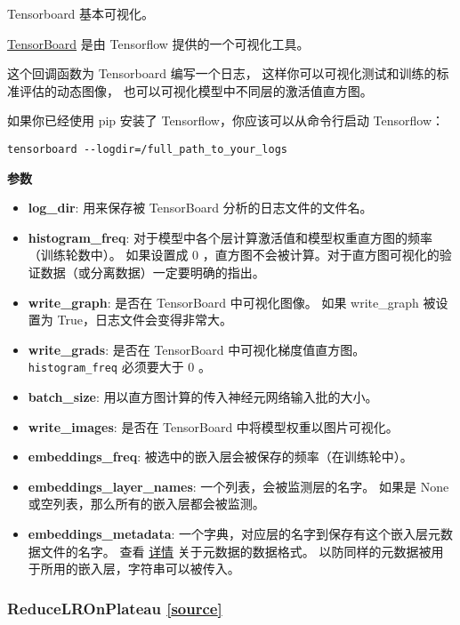 Tensorboard 基本可视化。

\href{https://www.tensorflow.org/get_started/summaries_and_tensorboard}{TensorBoard}
是由 Tensorflow 提供的一个可视化工具。

这个回调函数为 Tensorboard 编写一个日志，
这样你可以可视化测试和训练的标准评估的动态图像，
也可以可视化模型中不同层的激活值直方图。

如果你已经使用 pip 安装了 Tensorflow，你应该可以从命令行启动
Tensorflow：

\begin{verbatim}
tensorboard --logdir=/full_path_to_your_logs
\end{verbatim}

\textbf{参数}

\begin{itemize}
\tightlist
\item
  \textbf{log\_dir}: 用来保存被 TensorBoard 分析的日志文件的文件名。
\item
  \textbf{histogram\_freq}:
  对于模型中各个层计算激活值和模型权重直方图的频率（训练轮数中）。
  如果设置成 0
  ，直方图不会被计算。对于直方图可视化的验证数据（或分离数据）一定要明确的指出。
\item
  \textbf{write\_graph}: 是否在 TensorBoard 中可视化图像。 如果
  write\_graph 被设置为 True，日志文件会变得非常大。
\item
  \textbf{write\_grads}: 是否在 TensorBoard 中可视化梯度值直方图。
  \texttt{histogram\_freq} 必须要大于 0 。
\item
  \textbf{batch\_size}: 用以直方图计算的传入神经元网络输入批的大小。
\item
  \textbf{write\_images}: 是否在 TensorBoard 中将模型权重以图片可视化。
\item
  \textbf{embeddings\_freq}:
  被选中的嵌入层会被保存的频率（在训练轮中）。
\item
  \textbf{embeddings\_layer\_names}: 一个列表，会被监测层的名字。 如果是
  None 或空列表，那么所有的嵌入层都会被监测。
\item
  \textbf{embeddings\_metadata}:
  一个字典，对应层的名字到保存有这个嵌入层元数据文件的名字。 查看
  \href{https://www.tensorflow.org/how_tos/embedding_viz/\#metadata_optional}{详情}
  关于元数据的数据格式。
  以防同样的元数据被用于所用的嵌入层，字符串可以被传入。
\end{itemize}



\subsubsection{ReduceLROnPlateau {\href{https://github.com/keras-team/keras/blob/master/keras/callbacks.py\#L811}{{[}source{]}}}}

